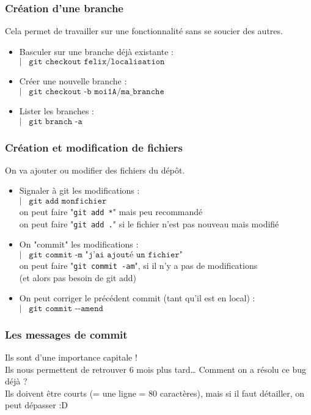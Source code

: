 \documentclass[9pt,a9paper,handout]{beamer}
\newcommand{\command}[1]{$\left|\;\;\;\texttt{#1}\right.$}
\begin{document}
\begin{frame}
\frametitle{Création d'une branche}
Cela permet de travailler sur une fonctionnalité sans se soucier des autres.
\begin{itemize}
    \item Basculer sur une branche déjà existante :\\
        \command{git checkout felix/localisation}
    \item Créer une nouvelle branche :\\
        \command{git checkout -b moi1A/ma\_branche}
    \item Lister les branches :\\
        \command{git branch -a}
\end{itemize}
\end{frame}

\begin{frame}
\frametitle{Création et modification de fichiers}
On va ajouter ou modifier des fichiers du dépôt.
\begin{itemize}
    \item Signaler à git les modifications :\\
    \command{git add monfichier}\\
        on peut faire "\texttt{git add *}" mais peu recommandé\\
        on peut faire "\texttt{git add .}" si le fichier n'est pas nouveau mais modifié\\
    \item On "commit" les modifications :\\
        \command{git commit -m "j'ai ajouté un fichier"}\\
        on peut faire "\texttt{git commit -am}", si il n'y a pas de modifications \\(et alors pas besoin de git add)
    \item On peut corriger le précédent commit (tant qu'il est en local) :
        \command{git commit -{}-amend}
\end{itemize}
\end{frame}


\begin{frame}
\frametitle{Les messages de commit}
Ils sont d'une importance capitale !\\

Ils nous permettent de retrouver 6 mois plus tard… Comment on a résolu ce bug déjà ?\\

Ils doivent être courts (= une ligne = 80 caractères), mais si il faut détailler, on peut dépasser :D
\end{frame}
\end{document}
